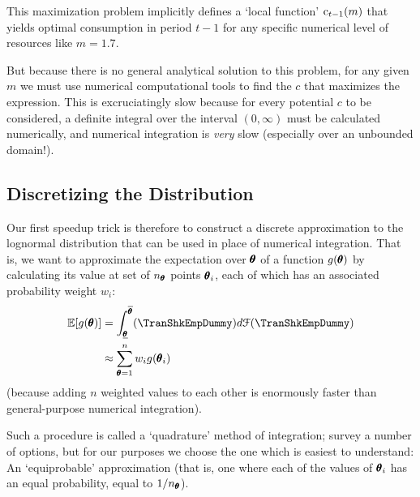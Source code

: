\documentclass[titlepage, headings=optiontotocandhead]{Resources/texmf-local/tex/latex/econtex}
\begin{document}
\lstset{basicstyle=\ttfamily\footnotesize,breaklines=true,language=Python,frame=single}


This maximization problem implicitly defines a `local function' $\mathrm{c}_{t-1}(m)$ that yields optimal consumption in period $t-1$ for any specific numerical level of resources like $m=1.7$.%

But because there is no general analytical solution to this problem, for any given $m$ we must use numerical computational tools to find the $c$ that maximizes the expression.  This is excruciatingly slow because for every potential $c$ to be considered, a definite integral over the interval $(0,\infty)$ must be calculated numerically, and numerical integration is \textit{very} slow (especially over an unbounded domain!).

\hypertarget{discretizing-the-distribution}{}
\subsection{Discretizing the Distribution}
Our first speedup trick is therefore to construct a discrete approximation to the lognormal distribution that can be used in place of numerical integration.  That is, we want to approximate the expectation over $\pmb{\theta}$ of a function $g(\pmb{\theta})$ by calculating its value at set of $n_{\pmb{\theta}}$ points $\pmb{\theta}_{i}$, each of which has an associated probability weight $w_{i}$:
\begin{equation*}\begin{gathered}\begin{aligned}
      \Ex[g(\TranShkEmp)] & = \int_{\TranShkEmpMin}^{\TranShkEmpMax}(\TranShkEmpDummy)d\FDist(\TranShkEmpDummy) \\
      & \approx \sum_{\TranShkEmp = 1}^{n}w_{i}g(\TranShkEmp_{i})
    \end{aligned}\end{gathered}\end{equation*}
(because adding $n$ weighted values to each other is enormously faster than general-purpose numerical integration).

Such a procedure is called a `quadrature' method of integration; \cite{Tanaka2013-bc} survey a number of options, but for our purposes we choose the one which is easiest to understand: An `equiprobable' approximation (that is, one where each of the values of $\pmb{\theta}_{i}$ has an equal probability, equal to $1/n_{\pmb{\theta}}$).
\end{document}
